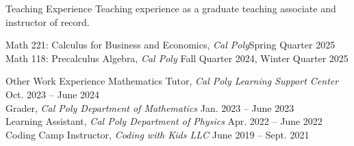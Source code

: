 \documentclass[
	11pt, %
]{cv} %
\begin{document}
\begin{rSection}{Teaching Experience}
	Teaching experience as a graduate teaching associate and instructor of record.

	Math 221: Calculus for Business and Economics, \textit{Cal Poly}\dotfill Spring Quarter 2025 \\
	Math 118: Precalculus Algebra, \textit{Cal Poly} \dotfill Fall Quarter 2024, Winter Quarter 2025
\end{rSection}

\begin{rSection}{Other Work Experience}
	Mathematics Tutor, \textit{Cal Poly Learning Support Center} \dotfill Oct. 2023 -- June 2024 \\
	Grader, \textit{Cal Poly Department of Mathematics} \dotfill Jan. 2023 -- June 2023 \\
	Learning Assistant, \textit{Cal Poly Department of Physics} \dotfill Apr. 2022 -- June 2022 \\
	Coding Camp Instructor, \textit{Coding with Kids LLC} \dotfill June 2019 -- Sept. 2021
\end{rSection}
\end{document}
